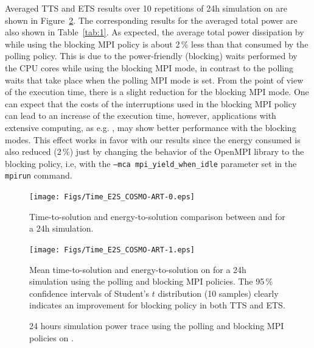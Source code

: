 Averaged TTS and ETS results  over 10 repetitions of 24h simulation on
\tinto are shown in  Figure~\ref{fig:4}. The corresponding results for
the  averaged total  power are  also shown  in  Table~\ref{tab:1}.  As
expected, the average total power dissipation by \cosmoart while using
the blocking MPI policy is about  2\,\% less than that consumed by the
polling  policy. This is  due to  the power-friendly  (blocking) waits
performed  by the  CPU cores  while using  the blocking  MPI  mode, in
contrast to  the polling  waits that take  place when the  polling MPI
mode is set. From the point of  view of the execution time, there is a
slight reduction  for the blocking MPI  mode. One can  expect that the
costs of the interruptions used in the blocking MPI policy can lead to
an  increase  of  the   execution  time,  however,  applications  with
extensive computing,  as e.g.  \cosmoart, may show  better performance
with the blocking  modes. This effect works in  favor with our results
since the energy consumed is also reduced (2\,\%) just by changing the
behavior of the OpenMPI library  to the blocking policy, i.e, with the
\texttt{--mca    mpi\_yield\_when\_idle}   parameter   set    in   the
\texttt{mpirun} command.

\begin{figure}[htbf]
  \centering
  \texttt{[image: Figs/Time\_E2S\_COSMO-ART-0.eps]}
  \caption{Time-to-solution and  energy-to-solution comparison between
    \pilat and \monch for a 24h simulation.}
  \label{fig:3}
\end{figure}

\begin{figure}[htbf]
  \centering
  \texttt{[image: Figs/Time\_E2S\_COSMO-ART-1.eps]}
  \vspace{-1cm}
  \caption{Mean time-to-solution and  energy-to-solution on \tinto for
    a 24h simulation using the  polling and blocking MPI policies. The
    95\,\%  confidence  intervals of  Student's  $t$ distribution  (10
    samples) clearly  indicates an improvement for  blocking policy in
    both TTS and ETS.}
  \label{fig:4}
\end{figure}

\begin{figure}[ht]
  \centering
  \hspace{0.8cm} \scalebox{0.62}{}
  \caption{24  hours  simulation power  trace  using  the polling  and
    blocking MPI policies on \tinto.}
  \label{fig:5}
\end{figure}

